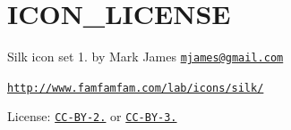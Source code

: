 \chapter{ICON\+\_\+\+LICENSE }
\hypertarget{md_venv_2_lib_2site-packages_2werkzeug_2debug_2shared_2_i_c_o_n___l_i_c_e_n_s_e}{}\label{md_venv_2_lib_2site-packages_2werkzeug_2debug_2shared_2_i_c_o_n___l_i_c_e_n_s_e}
Silk icon set 1. by Mark James \href{mailto:mjames@gmail.com}{\texttt{mjames@gmail.\+com}}

\href{http://www.famfamfam.com/lab/icons/silk/}{\texttt{http:\+/\+/\+www.\+famfamfam.\+com/\+lab/\+icons/\+silk/\+}}

License:\+ \href{https://creativecommons.org/licenses/by/2.5/}{\texttt{CC-\/\+BY-\/2.}} or \href{https://creativecommons.org/licenses/by/3.0/}{\texttt{CC-\/\+BY-\/3.}} 